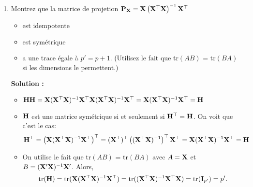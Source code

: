 \documentclass[letter, 11pt]{article}
\newcommand{\prof}[1]{\begin{professeur}\color{blue} {\bf Solution :} #1 \end{professeur}}
\begin{document}
\begin{enumerate}[leftmargin=*, wide, label=\bf Exercice \arabic*:]
{\begin{itemize}
\begin{align*}
\begin{pmatrix}
            \dfrac{\partial \bf{v'Av}}{\partial v_1} \\[4mm]
            \dfrac{\partial \bf{v'Av}}{\partial v_2}
        \end{pmatrix}
        = \begin{pmatrix}
            6v_1+5v_2 \\[4mm]
            5v_1 + 4v_2
        \end{pmatrix}
        = \begin{pmatrix}
            6 & 5 \\[4mm]
            5 & 4
        \end{pmatrix}
        {\bold v}
        = (\bf{A}+\bf{A}')\bf{v}
    \end{align*}
    \end{itemize}}

\item Montrez que la matrice de projetion $\bold P_{\bold X} = \bold X \left( \bold X^\top \bold X\right)^{-1} \bold X^\top$
    \begin{itemize}
    \item[(a)] est idempotente
    \item[(b)] est symétrique 
    \item[(c)] a une trace égale à $p' = p+1$. (Utilisez le fait que  tr$(AB)$ = tr$(BA)$ si les dimensions le permettent.)
    \end{itemize}

\prof{
 \begin{itemize}
    \item[(a)]$\bold H\bold H = \bold X(\bold X^\top\bold X)^{-1}\bold X^\top\bold X(\bold X^\top\bold X)^{-1}\bold X^\top=\bold X(\bold X^\top\bold X)^{-1}\bold X^\top=\bold H$

    \item[(b)]$\bold H$ est une matrice symétrique si et seulement si $\bold H^\top=\bold H$. On voit  que c'est le cas:
    $$\bold H^\top = \left(\bold X(\bold X^\top\bold X)^{-1}\bold X^\top\right)^\top=(\bold X^\top)^\top\left((\bold X^\top\bold X)^{-1}\right)^\top\bold X^\top
    =\bold X(\bold X^\top\bold X)^{-1}\bold X^\top = \bold H$$
    \item[(c)]On utilise le fait que  tr$(AB)$ = tr$(BA)$ avec $A=\bold X$ et $B=(\bold X'\bold X)^{-1}\bold X'$. Alors,
    $$\mbox{tr}(\bold H) = \mbox{tr}(\bold X(\bold X^\top\bold X)^{-1}\bold X^\top)=\mbox{tr}((\bold X^\top\bold X)^{-1}\bold X^\top\bold X)=\mbox{tr}({\bold{I}_{p'}})=p'.$$
    \end{itemize}
}


\end{enumerate}
\end{document}
